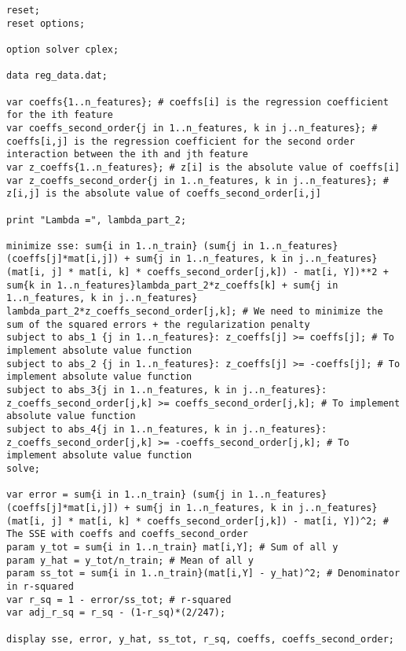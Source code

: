 \documentclass[15pt,a4paper,openright]{article}
\begin{document}
\begin{lstlisting}[language=AMPL, caption=2f Code]
reset;
reset options;

option solver cplex;

data reg_data.dat;

var coeffs{1..n_features}; # coeffs[i] is the regression coefficient for the ith feature
var coeffs_second_order{j in 1..n_features, k in j..n_features}; # coeffs[i,j] is the regression coefficient for the second order interaction between the ith and jth feature
var z_coeffs{1..n_features}; # z[i] is the absolute value of coeffs[i]
var z_coeffs_second_order{j in 1..n_features, k in j..n_features}; # z[i,j] is the absolute value of coeffs_second_order[i,j]

print "Lambda =", lambda_part_2;

minimize sse: sum{i in 1..n_train} (sum{j in 1..n_features}(coeffs[j]*mat[i,j]) + sum{j in 1..n_features, k in j..n_features}(mat[i, j] * mat[i, k] * coeffs_second_order[j,k]) - mat[i, Y])**2 + sum{k in 1..n_features}lambda_part_2*z_coeffs[k] + sum{j in 1..n_features, k in j..n_features} lambda_part_2*z_coeffs_second_order[j,k]; # We need to minimize the sum of the squared errors + the regularization penalty
subject to abs_1 {j in 1..n_features}: z_coeffs[j] >= coeffs[j]; # To implement absolute value function
subject to abs_2 {j in 1..n_features}: z_coeffs[j] >= -coeffs[j]; # To implement absolute value function
subject to abs_3{j in 1..n_features, k in j..n_features}: z_coeffs_second_order[j,k] >= coeffs_second_order[j,k]; # To implement absolute value function
subject to abs_4{j in 1..n_features, k in j..n_features}: z_coeffs_second_order[j,k] >= -coeffs_second_order[j,k]; # To implement absolute value function
solve;

var error = sum{i in 1..n_train} (sum{j in 1..n_features}(coeffs[j]*mat[i,j]) + sum{j in 1..n_features, k in j..n_features}(mat[i, j] * mat[i, k] * coeffs_second_order[j,k]) - mat[i, Y])^2; # The SSE with coeffs and coeffs_second_order
param y_tot = sum{i in 1..n_train} mat[i,Y]; # Sum of all y
param y_hat = y_tot/n_train; # Mean of all y
param ss_tot = sum{i in 1..n_train}(mat[i,Y] - y_hat)^2; # Denominator in r-squared
var r_sq = 1 - error/ss_tot; # r-squared
var adj_r_sq = r_sq - (1-r_sq)*(2/247);

display sse, error, y_hat, ss_tot, r_sq, coeffs, coeffs_second_order;
\end{lstlisting}
		
\end{document}
